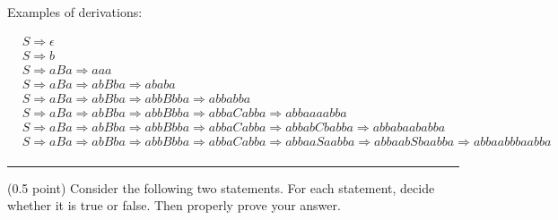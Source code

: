 \documentclass[10pt]{article}
\begin{document}
\begin{description}
       Examples of derivations:

        \begin{align*}
        & S \Rightarrow \epsilon \\
        & S \Rightarrow b \\
        & S \Rightarrow aBa \Rightarrow aaa \\
        & S \Rightarrow aBa \Rightarrow abBba \Rightarrow ababa \\
        & S \Rightarrow aBa \Rightarrow abBba \Rightarrow abbBbba \Rightarrow abbabba \\
        & S \Rightarrow aBa \Rightarrow abBba \Rightarrow abbBbba \Rightarrow abbaCabba \Rightarrow abbaaaabba \\
        & S \Rightarrow aBa \Rightarrow abBba \Rightarrow abbBbba \Rightarrow abbaCabba \Rightarrow abbabCbabba \Rightarrow abbabaababba\\
        & S \Rightarrow aBa \Rightarrow abBba \Rightarrow abbBbba \Rightarrow abbaCabba \Rightarrow abbaaSaabba \Rightarrow abbaabSbaabba \Rightarrow abbaabbbaabba\\
        \end{align*}
        
\end{description}

\noindent\rule{\textwidth}{0.4pt}
\vskip 0.3cm

\noindent
(0.5 point) Consider the following two statements. For each statement, decide whether it is true or false. Then properly prove your answer. 
\end{document}
